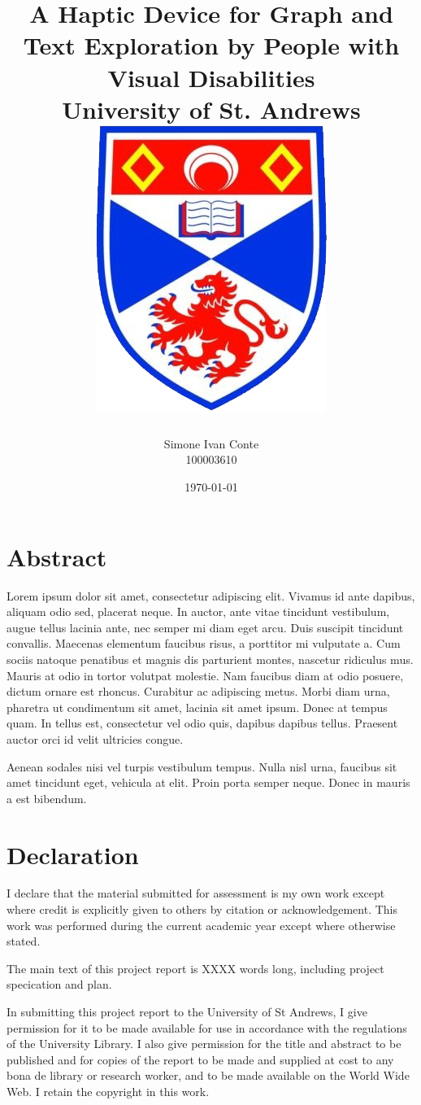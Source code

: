 \documentclass[12pt]{report}
\title{}
\title{
	{A Haptic Device for Graph and Text Exploration by People with Visual Disabilities}\\
	{\large University of St. Andrews}\\
	{\includegraphics{St_Andrews_Logo.png}}
}
\author{Simone Ivan Conte \\ 100003610}
\date{\today}
\begin{document}
\maketitle
\newpage

\chapter*{Abstract}
Lorem ipsum dolor sit amet, consectetur adipiscing elit. Vivamus id ante dapibus, aliquam odio sed, placerat neque. In auctor, ante vitae tincidunt vestibulum, augue tellus lacinia ante, nec semper mi diam eget arcu. Duis suscipit tincidunt convallis. Maecenas elementum faucibus risus, a porttitor mi vulputate a. Cum sociis natoque penatibus et magnis dis parturient montes, nascetur ridiculus mus. Mauris at odio in tortor volutpat molestie. Nam faucibus diam at odio posuere, dictum ornare est rhoncus. Curabitur ac adipiscing metus. Morbi diam urna, pharetra ut condimentum sit amet, lacinia sit amet ipsum. Donec at tempus quam. In tellus est, consectetur vel odio quis, dapibus dapibus tellus. Praesent auctor orci id velit ultricies congue.

Aenean sodales nisi vel turpis vestibulum tempus. Nulla nisl urna, faucibus sit amet tincidunt eget, vehicula at elit. Proin porta semper neque. Donec in mauris a est bibendum.

\chapter*{Declaration}
I declare that the material submitted for assessment is my own work except where credit is explicitly
given to others by citation or acknowledgement. This work was performed during the current academic
year except where otherwise stated.

The main text of this project report is XXXX words long, including project specication and plan.

In submitting this project report to the University of St Andrews, I give permission for it to be made
available for use in accordance with the regulations of the University Library. I also give permission for
the title and abstract to be published and for copies of the report to be made and supplied at cost to
any bona de library or research worker, and to be made available on the World Wide Web. I retain the
copyright in this work.


\tableofcontents
\newpage
\end{document}

